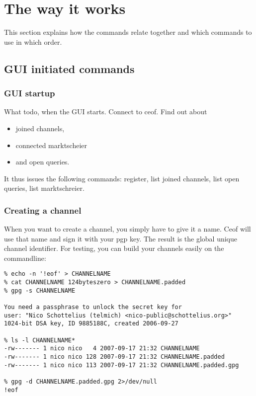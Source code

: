 \documentclass[12pt,a4paper]{article}
\begin{document}
\section{The way it works}
This section explains how the commands relate together and which commands to use
in which order.

\subsection{GUI initiated commands}
\subsubsection{GUI startup}
What todo, when the GUI starts.
Connect to ceof. Find out about
\begin{itemize}
\item joined channels,
\item connected marktscheier
\item and open queries.
\end{itemize}
It thus issues the following commands:
register, list joined channels, list open queries, list marktschreier.
\subsubsection{Creating a channel}
When you want to create a channel, you simply have to give it a name.
Ceof will use that name and sign it with your pgp key. The result is the
global unique channel identifier. For testing, you can build your channels
easily on the commandline:
\begin{verbatim}
% echo -n '!eof' > CHANNELNAME
% cat CHANNELNAME 124byteszero > CHANNELNAME.padded
% gpg -s CHANNELNAME 

You need a passphrase to unlock the secret key for
user: "Nico Schottelius (telmich) <nico-public@schottelius.org>"
1024-bit DSA key, ID 9885188C, created 2006-09-27

% ls -l CHANNELNAME*
-rw------- 1 nico nico   4 2007-09-17 21:32 CHANNELNAME
-rw------- 1 nico nico 128 2007-09-17 21:32 CHANNELNAME.padded
-rw------- 1 nico nico 113 2007-09-17 21:32 CHANNELNAME.padded.gpg

% gpg -d CHANNELNAME.padded.gpg 2>/dev/null
!eof
\end{verbatim}
\end{document}
